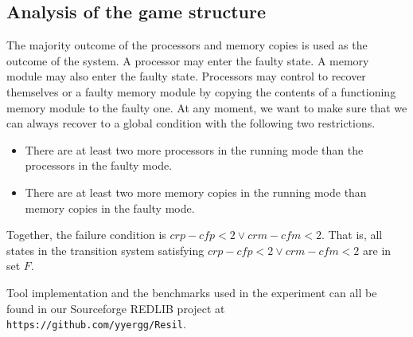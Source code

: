 \documentclass[times,10pt,twocolumn]{article}
\begin{document}
\subsection*{Analysis of the game structure} 
The majority outcome of the processors and memory copies 
is used as the outcome of the system.  
A processor may enter the faulty state.  
A memory module may also enter the faulty state. 
Processors may control to recover themselves or a faulty memory module 
by copying the contents of a functioning memory module to 
the faulty one.  
At any moment, we want to make sure that we can always recover 
to a global condition with the following two restrictions. 
\begin{itemize} 
\item There are at least two more processors in \label{reply2.2more} 
	the running mode than the processors in the faulty mode.  
\item There are at least two more memory copies in 
	the running mode than memory copies in the faulty mode. 
\end{itemize} 
Together, the failure condition is 
$\textit{crp}-\textit{cfp}<2\vee\textit{crm}-\textit{cfm}<2$.  
That is, all states in the transition system satisfying 
$\textit{crp}-\textit{cfp}<2\vee\textit{crm}-\textit{cfm}<2$ 
are in set $F$.  

Tool implementation and the benchmarks used in the experiment 
can all be found in our Sourceforge REDLIB project at 
\verb+https://github.com/yyergg/Resil+.  






%
%
\smallskip
\end{document}
